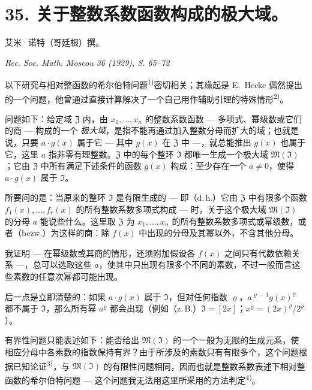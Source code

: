 \section*{35. 关于整数系数函数构成的极大域。}

\begin{center}
艾米·诺特（哥廷根）撰。\par
\emph{Rec. Soc. Math. Moscou 36 (1929), S. 65--72}
\end{center}




以下研究与相对整函数的希尔伯特问题\textsuperscript{1)}密切相关；其缘起是 E.\ Hecke 偶然提出的一个问题，他曾通过直接计算解决了一个自己用作辅助引理的特殊情形\textsuperscript{2)}。

问题如下：给定域 $\mathfrak{Z}$ 内，由 $x_1,\ldots,x_n$ 的整数系数函数 --- 多项式、幂级数或它们的商 --- 构成的一个 \textit{极大域}，是指不能再通过加入整数分母而扩大的域；也就是说，只要 $a \cdot g(x)$ 属于它 --- 其中 $g(x)$ 在 $\mathfrak{Z}$ 中 ---，就总能推出 $g(x)$ 也属于它，这里 $a$ 指非零有理整数。$\mathfrak{Z}$ 中的每个整环 $\mathfrak{I}$ 都唯一生成一个极大域 $\mathfrak{M}(\mathfrak{I})$；它由 $\mathfrak{Z}$ 中所有满足下述条件的函数 $g(x)$ 构成：至少存在一个 $a \neq 0$，使得 $a \cdot g(x)$ 属于 $\mathfrak{I}$。

所要问的是：当原来的整环 $\mathfrak{I}$ 是有限生成的 --- 即（d.\,h.）它由 $\mathfrak{Z}$ 中有限多个函数 $f_1(x),\ldots,f_r(x)$ 的所有整数系数多项式构成 --- 时，关于这个极大域 $\mathfrak{M}(\mathfrak{I})$ 的分母 $a$ 能说些什么。这里取 $\mathfrak{Z}$ 为 $x_1,\ldots,x_n$ 的所有整数系数多项式或幂级数，或者（bezw.）为这样的商：除 $f(x)$ 中出现的分母及其幂以外，不含其他分母。

我证明 --- 在幂级数或其商的情形，还须附加假设各 $f(x)$ 之间只有代数依赖关系 ---，总可以选取这些 $a$，使其中只出现有限多个不同的素数，不过一般而言这些素数的任意次幂都可能出现。

后一点是立即清楚的：如果 $a\cdot g(x)$ 属于 $\mathfrak{I}$，但对任何指数 $\varrho$，$a^{\varrho-1}g(x)^{\varrho}$ 都不属于 $\mathfrak{I}$，那么所有幂 $a^{\varrho}$ 都会出现（例如（z.\,B.）$\mathfrak{I}=[2x]$；$x^{\varrho}=(2x)^{\varrho}/2^{\varrho}$）。

有界性问题只能表述如下：能否给出 $\mathfrak{M}(\mathfrak{I})$ 的一个一般为无限的生成元系，使相应分母中各素数的指数保持有界？由于所涉及的素数只有有限多个，这个问题根据已知论证\textsuperscript{3)}，与 $\mathfrak{M}(\mathfrak{I})$ 的有限性问题相同，因而也就是整数系数表述下相对整函数的希尔伯特问题 --- 这个问题我无法用这里所采用的方法判定\textsuperscript{4)}。

